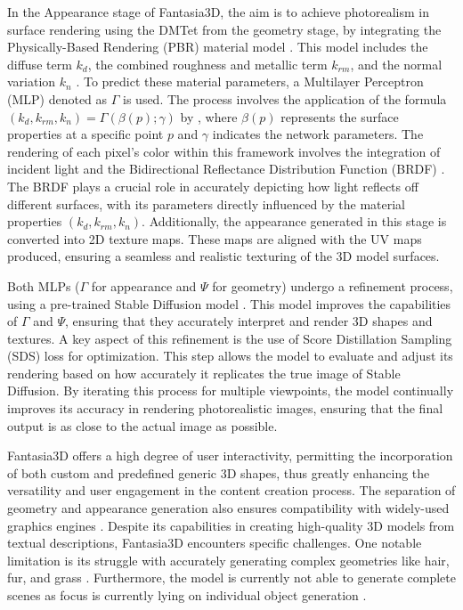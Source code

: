 In the Appearance stage of Fantasia3D, the aim is to achieve photorealism in surface rendering using the DMTet from the geometry stage, by integrating the Physically-Based Rendering (PBR) material model \citep{mcauley2012practical}. This model includes the diffuse term \( k_d \), the combined roughness and metallic term \( k_{rm} \), and the normal variation \( k_n \) \citep{chen2023fantasia3d}. To predict these material parameters, a Multilayer Perceptron (MLP) denoted as \( \Gamma \) is used. The process involves the application of the formula \((k_d, k_{rm}, k_n) = \Gamma(\beta(p); \gamma)\) by \citeauthor{chen2023fantasia3d}, where \( \beta(p) \) represents the surface properties at a specific point \( p \) and \( \gamma \) indicates the network parameters. The rendering of each pixel's color within this framework involves the integration of incident light and the Bidirectional Reflectance Distribution Function (BRDF) \citep{chen2023fantasia3d}. The BRDF plays a crucial role in accurately depicting how light reflects off different surfaces, with its parameters directly influenced by the material properties \( (k_d, k_{rm}, k_n) \). Additionally, the appearance generated in this stage is converted into 2D texture maps. These maps are aligned with the UV maps produced, ensuring a seamless and realistic texturing of the 3D model surfaces.

Both MLPs (\(\Gamma\) for appearance and \(\Psi\) for geometry) undergo a refinement process, using a pre-trained Stable Diffusion model \citep{rombachStableDiffusion}. This model improves the capabilities of \(\Gamma\) and \(\Psi\), ensuring that they accurately interpret and render 3D shapes and textures. A key aspect of this refinement is the use of Score Distillation Sampling (SDS) loss \citep{mildenhallNERF} for optimization. This step allows the model to evaluate and adjust its rendering based on how accurately it replicates the true image of Stable Diffusion. By iterating this process for multiple viewpoints, the model continually improves its accuracy in rendering photorealistic images, ensuring that the final output is as close to the actual image as possible.

Fantasia3D offers a high degree of user interactivity, permitting the incorporation of both custom and predefined generic 3D shapes, thus greatly enhancing the versatility and user engagement in the content creation process. The separation of geometry and appearance generation also ensures compatibility with widely-used graphics engines \citep{chen2023fantasia3d}. Despite its capabilities in creating high-quality 3D models from textual descriptions, Fantasia3D encounters specific challenges. One notable limitation is its struggle with accurately generating complex geometries like hair, fur, and grass \citep{chen2023fantasia3d}. Furthermore, the model is currently not able to generate complete scenes as focus is currently lying on individual object generation \citep{chen2023fantasia3d}.